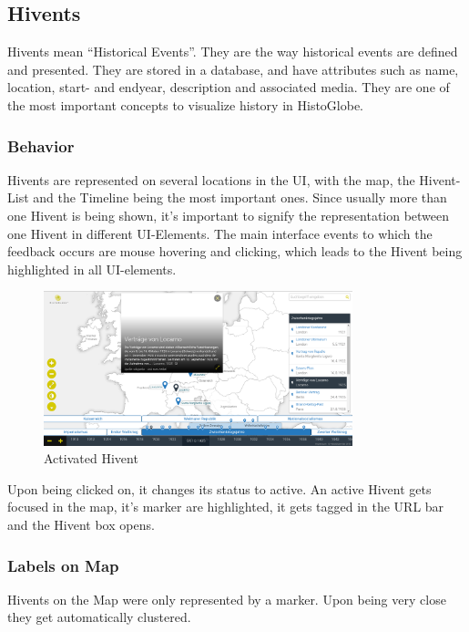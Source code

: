 \subsection{Hivents} %
\label{sec:hivents}

Hivents mean ``Historical Events''. They are the way historical events are defined and presented. They are stored in a database, and have attributes such as name, location, start- and endyear, description and associated media.
They are one of the most important concepts to visualize history in HistoGlobe.

\subsubsection{Behavior} %
\label{sub:behaviour}
Hivents are represented on several locations in the UI, with the map, the Hivent-List and the Timeline being the most important ones.
Since usually more than one Hivent is being shown, it's important to signify the representation between one Hivent in different UI-Elements.
The main interface events to which the feedback occurs are mouse hovering and clicking, which leads to the Hivent being highlighted in all UI-elements.

\begin{figure}[ht]
  \begin{center}
    \includegraphics[width=0.8\textwidth]{graphics/activated_hivent.png}
  \end{center}
  \caption{Activated Hivent}
  \label{fig:activated_hivent}
\end{figure}

Upon being clicked on, it changes its status to active. An active Hivent gets focused in the map, it's marker are highlighted, it gets tagged in the URL bar and the Hivent box opens.

\subsubsection{Labels on Map}
Hivents on the Map were only represented by a marker.
Upon being very close they get automatically clustered.

